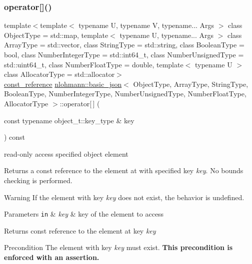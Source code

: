 \subsubsection{\texorpdfstring{operator[]()}{operator[]()}\hspace{0.1cm}{\footnotesize\ttfamily [4/10]}}
{\footnotesize\ttfamily template$<$template$<$ typename U, typename V, typename... Args $>$ class Object\+Type = std\+::map, template$<$ typename U, typename... Args $>$ class Array\+Type = std\+::vector, class String\+Type  = std\+::string, class Boolean\+Type  = bool, class Number\+Integer\+Type  = std\+::int64\+\_\+t, class Number\+Unsigned\+Type  = std\+::uint64\+\_\+t, class Number\+Float\+Type  = double, template$<$ typename U $>$ class Allocator\+Type = std\+::allocator$>$ \\
\hyperlink{classnlohmann_1_1basic__json_af677a29b0e66edc9f66e5167e4667071}{const\+\_\+reference} \hyperlink{classnlohmann_1_1basic__json}{nlohmann\+::basic\+\_\+json}$<$ Object\+Type, Array\+Type, String\+Type, Boolean\+Type, Number\+Integer\+Type, Number\+Unsigned\+Type, Number\+Float\+Type, Allocator\+Type $>$\+::operator\mbox{[}$\,$\mbox{]} (\begin{DoxyParamCaption}\item[{const typename object\+\_\+t\+::key\+\_\+type \&}]{key }\end{DoxyParamCaption}) const\hspace{0.3cm}{\ttfamily [inline]}}



read-\/only access specified object element 

Returns a const reference to the element at with specified key {\itshape key}. No bounds checking is performed.

\begin{DoxyWarning}{Warning}
If the element with key {\itshape key} does not exist, the behavior is undefined.
\end{DoxyWarning}

\begin{DoxyParams}[1]{Parameters}
\mbox{\tt in}  & {\em key} & key of the element to access\\
\hline
\end{DoxyParams}
\begin{DoxyReturn}{Returns}
const reference to the element at key {\itshape key} 
\end{DoxyReturn}
\begin{DoxyPrecond}{Precondition}
The element with key {\itshape key} must exist. {\bfseries This precondition is enforced with an assertion.}
\end{DoxyPrecond}

